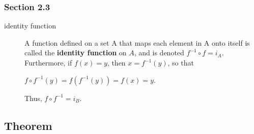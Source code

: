 \documentclass[12pt]{article}
\begin{document}
\subsubsection{Section 2.3}
\label{sec:org8f3acfd}
\begin{description}
\item[{identity function}] A function defined on a set A that maps each element in A
onto itself is called the \textbf{identity function} on \(A\), and is denoted
\(f^{-1}\circ{}f=i_{A}\). Furthermore, if \(f(x)=y\), then \(x=f^{-1}(y)\), so that
\begin{center}
\(f\circ{}f^{-1}(y)=f(f^{-1}(y))=f(x)=y\).
\end{center}
Thus, \(f\circ{}f^{-1}=i_{B}\).
\end{description}

\subsection{Theorem}
\label{sec:orga86b921}
\end{document}
